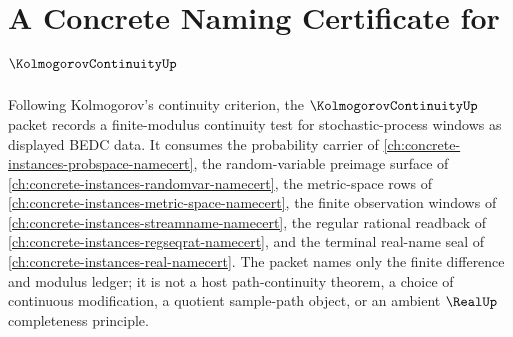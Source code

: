 \chapter{A Concrete Naming Certificate for $\KolmogorovContinuityUp$}
\label{ch:concrete-instances-kolmogorov-continuity-namecert}

Following Kolmogorov's continuity criterion, the $\KolmogorovContinuityUp$ packet records a finite-modulus continuity test for stochastic-process windows as displayed BEDC data. It consumes the probability carrier of \autoref{ch:concrete-instances-probspace-namecert}, the random-variable preimage surface of \autoref{ch:concrete-instances-randomvar-namecert}, the metric-space rows of \autoref{ch:concrete-instances-metric-space-namecert}, the finite observation windows of \autoref{ch:concrete-instances-streamname-namecert}, the regular rational readback of \autoref{ch:concrete-instances-regseqrat-namecert}, and the terminal real-name seal of \autoref{ch:concrete-instances-real-namecert}. The packet names only the finite difference and modulus ledger; it is not a host path-continuity theorem, a choice of continuous modification, a quotient sample-path object, or an ambient $\RealUp$ completeness principle.

